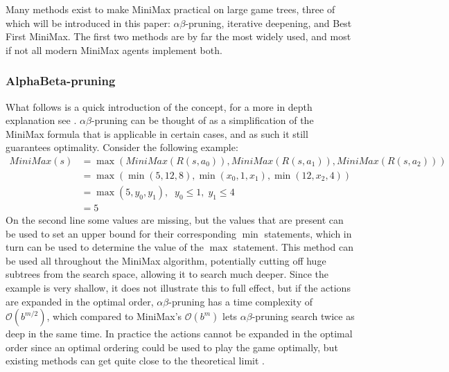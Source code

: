 Many methods exist to make MiniMax practical on large game trees, three of which will be introduced in this paper: $\alpha\beta$-pruning, iterative deepening, and Best First MiniMax.  The first two methods are by far the most widely used, and most if not all modern MiniMax agents implement both.

\subsubsection{AlphaBeta-pruning}
What follows is a quick introduction of the concept, for a more in depth explanation see \cite[p. 198]{russellnorvig}.
$\alpha\beta$-pruning can be thought of as a simplification of the MiniMax formula that is applicable in certain cases, and as such it still guarantees optimality. Consider the following example:
\begin{align*}
    MiniMax(s) &= \max(MiniMax(R(s, a_0)), MiniMax(R(s, a_1)), 
    MiniMax(R(s, a_2))) \\
    &= \max(\min(5, 12, 8), \min(x_0, 1, x_1), \min(12, x_2, 4)) \\
    &= \max(5, y_0, y_1), \;\; y_0 \leq 1, \; y_1 \leq 4 \\
    &= 5
\end{align*}
On the second line some values are missing, but the values that are present can be used to set an upper bound for their corresponding $\min$ statements, which in turn can be used to determine the value of the $\max$ statement. This method can be used all throughout the MiniMax algorithm, potentially cutting off huge subtrees from the search space, allowing it to search much deeper. Since the example is very shallow, it does not illustrate this to full effect, but if the actions are expanded in the optimal order, $\alpha\beta$-pruning has a time complexity of $\mathcal{O}(b^{m/2})$, which compared to MiniMax's $\mathcal{O}(b^{m})$ lets $\alpha\beta$-pruning search twice as deep in the same time. In practice the actions cannot be expanded in the optimal order since an optimal ordering could be used to play the game optimally, but existing methods can get quite close to the theoretical limit \cite[p. 201]{russellnorvig}.




